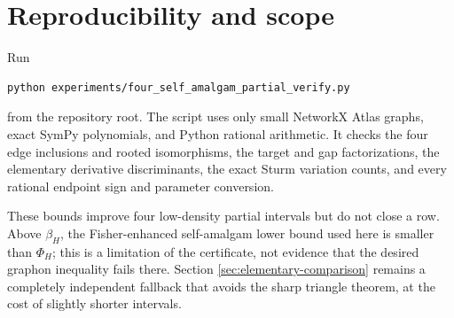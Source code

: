 \documentclass[11pt]{article}
\begin{document}
\section{Reproducibility and scope}

Run
\begin{verbatim}
python experiments/four_self_amalgam_partial_verify.py
\end{verbatim}
from the repository root.  The script uses only small NetworkX Atlas
graphs, exact SymPy polynomials, and Python rational arithmetic.  It checks
the four edge inclusions and rooted isomorphisms, the target and gap
factorizations, the elementary derivative discriminants, the exact Sturm
variation counts, and every rational endpoint sign and parameter conversion.

These bounds improve four low-density partial intervals but do not close a
row.  Above $\beta_H$, the Fisher-enhanced self-amalgam lower bound used here
is smaller than $\Phi_H$; this is a limitation of the certificate, not
evidence that the desired graphon inequality fails there.  Section
\ref{sec:elementary-comparison} remains a completely independent fallback
that avoids the sharp triangle theorem, at the cost of slightly shorter
intervals.
\end{document}
